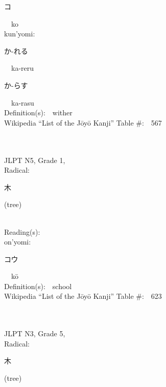 \begin{multicols}{2}
{\hspace*{2em}}{\begin{CJK}{UTF8}{min} コ \end{CJK}}\ \ ko\ \ \\
{\hspace*{1em}}kun'yomi:\ \ \\
{\hspace*{2em}}{\begin{CJK}{UTF8}{min} か-れる \end{CJK}}\ \ ka-reru\ \ \\
{\hspace*{2em}}{\begin{CJK}{UTF8}{min} か-らす \end{CJK}}\ \ ka-rasu\ \ \\
Definition(s):\ \ wither \\
Wikipedia ``List of the J\=oy\=o Kanji'' Table \#:\ \ 567 \\
\ \ \\
{\fontsize{34pt}{40pt}  }\ \ \\  %
{JLPT N5, Grade 1, \\Radical:\ \ {\begin{CJK}{UTF8}{min} 木 \end{CJK}} (tree) } \\
Reading(s):\ \ \\
{\hspace*{1em}}on'yomi:\ \ \\
{\hspace*{2em}}{\begin{CJK}{UTF8}{min} コウ \end{CJK}}\ \ k\=o\ \ \\
Definition(s):\ \ school \\
Wikipedia ``List of the J\=oy\=o Kanji'' Table \#:\ \ 623 \\
\ \ \\
{\fontsize{34pt}{40pt}  }\ \ \\  %
{JLPT N3, Grade 5, \\Radical:\ \ {\begin{CJK}{UTF8}{min} 木 \end{CJK}} (tree) } \\

\end{multicols}
